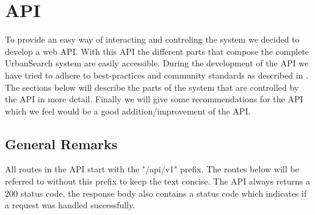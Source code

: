 \section{API}\label{sec: 5-API}
To provide an easy way of interacting and controling the system we decided to develop a web API. With this API the different parts that compose the complete UrbanSearch system are easily accessible. During the development of the API we have tried to adhere to best-practices and community standards as described in \cite{apigee}. The sections below will describe the parts of the system that are controlled by the API in more detail. Finally we will give some recommendations for the API which we feel would be a good addition/improvement of the API.

\subsection{General Remarks}

All routes in the API start with the "/api/v1" prefix. The routes below will be referred to without this prefix to keep the text concise. The API always returns a 200 status code, the response body also contains a status code which indicates if a request was handled successfully.





